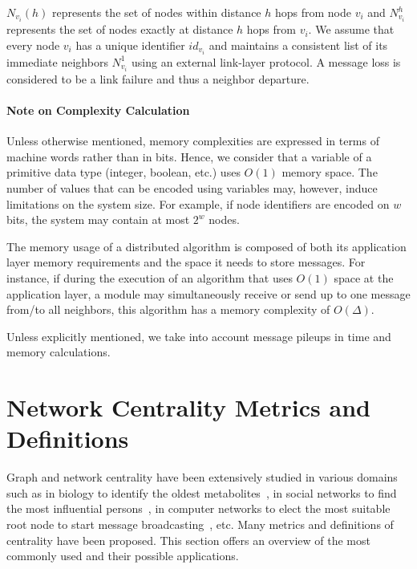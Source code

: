 $N_{v_i}(h)$ represents the set of nodes within distance $h$ hops from node $v_i$ and $N_{v_i}^h$ represents the set of nodes exactly at distance $h$ hops from $v_i$. We assume that every node $v_i$ has a unique identifier $id_{v_i}$ and maintains a consistent list of its immediate neighbors $N_{v_i}^1$ using an external link-layer protocol. A message loss is considered to be a link failure and thus a neighbor departure.

\paragraph{Note on Complexity Calculation}

Unless otherwise mentioned, memory complexities are expressed in terms of machine words rather than in bits. Hence, we consider that a variable of a primitive data type (integer, boolean, etc.) uses $O(1)$ memory space. The number of values that can be encoded using variables may, however, induce limitations on the system size. For example, if node identifiers are encoded on $w$ bits, the system may contain at most $2^w$ nodes. 

The memory usage of a distributed algorithm is composed of both its application layer memory requirements and the space it needs to store messages. For instance, if during the execution of an algorithm that uses $O(1)$ space at the application layer, a module may simultaneously receive or send up to one message from/to all neighbors, this algorithm has a memory complexity of $O(\Delta)$.

Unless explicitly mentioned, we take into account message pileups in time and memory calculations.

\section{Network Centrality Metrics and Definitions}
\label{section:centrality:centers}

Graph and network centrality have been extensively studied in various domains such as in biology to identify the oldest metabolites~\cite{wuchty2003centers}, in social networks to find the most influential persons~\cite{hanneman2005introduction}, in computer networks to elect the most suitable root node to start message broadcasting~\cite{Korach:1984:DAF:579.585}, etc. Many metrics and definitions of centrality have been proposed. This section offers an overview of the most commonly used and their possible applications.

